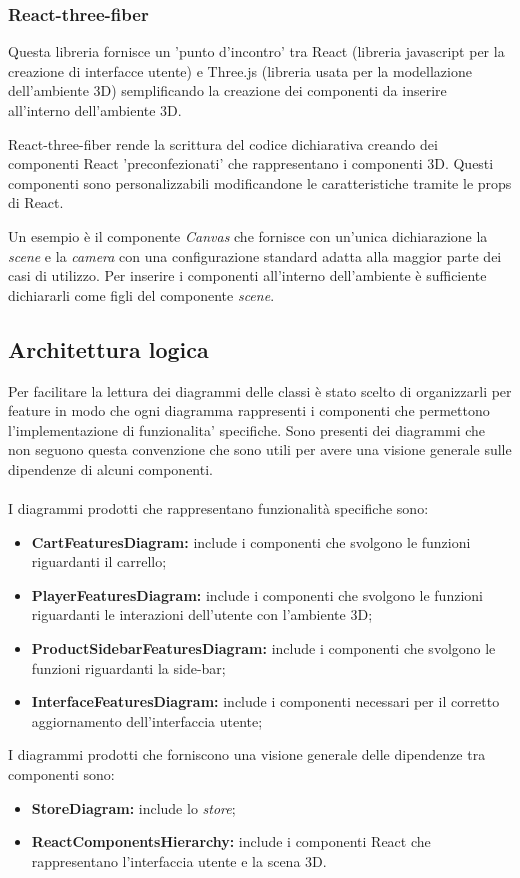 \subsubsection{React-three-fiber}
Questa libreria fornisce un 'punto d'incontro' tra React (libreria javascript per la creazione di interfacce utente) e Three.js (libreria usata per
la modellazione dell'ambiente 3D) semplificando la creazione dei componenti da inserire all'interno dell'ambiente 3D.

React-three-fiber rende la scrittura del codice dichiarativa creando dei componenti React 'preconfezionati' che rappresentano i componenti 3D.
Questi componenti sono personalizzabili modificandone le caratteristiche tramite le props di React.

Un esempio è il componente \textit{Canvas} che fornisce con un'unica dichiarazione la \textit{scene} e la \textit{camera} con una configurazione standard 
adatta alla maggior parte dei casi di utilizzo. Per inserire i componenti all'interno dell'ambiente è sufficiente dichiararli come figli del 
componente \textit{scene}.
\subsection{Architettura logica}
Per facilitare la lettura dei diagrammi delle classi è stato scelto di organizzarli per feature in modo che ogni diagramma 
rappresenti i componenti che permettono l'implementazione di funzionalita' specifiche.
Sono presenti dei diagrammi che non seguono questa convenzione che sono utili per avere una visione generale sulle dipendenze
di alcuni componenti.
\\\\
I diagrammi prodotti che rappresentano funzionalità specifiche sono:
\begin{itemize}
	\item \textbf{CartFeaturesDiagram:} include i componenti che svolgono le funzioni riguardanti il carrello;
	\item \textbf{PlayerFeaturesDiagram:} include i componenti che svolgono le funzioni riguardanti le interazioni dell'utente con 
	l'ambiente 3D;
	\item \textbf{ProductSidebarFeaturesDiagram:} include i componenti che svolgono le funzioni riguardanti la side-bar;
	\item \textbf{InterfaceFeaturesDiagram:} include i componenti necessari per il corretto aggiornamento dell'interfaccia utente;
\end{itemize}
I diagrammi prodotti che forniscono una visione generale delle dipendenze tra componenti sono:
\begin{itemize}
	\item \textbf{StoreDiagram:} include lo \textit{store};
	\item \textbf{ReactComponentsHierarchy:} include i componenti React che rappresentano l'interfaccia utente e la scena 3D.
\end{itemize}

